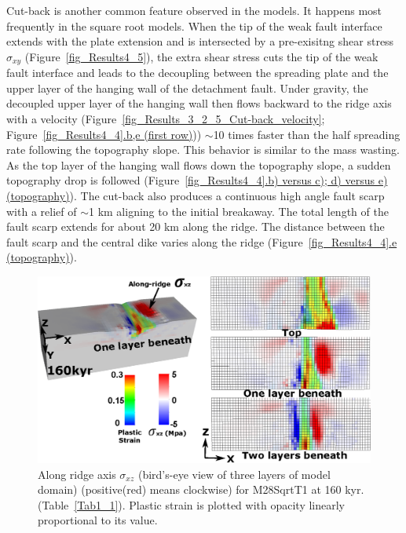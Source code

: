 Cut-back is another common feature observed in the models. It happens most frequently in the square root models. When the tip of the weak fault interface extends with the plate extension and is intersected by a pre-exisitng shear stress $\sigma_{xy}$ (Figure~\hyperref[fig_Results4_5]{\ref{fig_Results4_5}}), the extra shear stress cuts the tip of the weak fault interface and leads to the decoupling between the spreading plate and the upper layer of the hanging wall of the detachment fault. Under gravity, the decoupled upper layer of the hanging wall then flows backward to the ridge axis with a velocity (Figure~\hyperref[fig_Results_3_2_5_Cut-back_velocity]{\ref{fig_Results_3_2_5_Cut-back_velocity}}; Figure~\hyperref[fig_Results4_4]{\ref{fig_Results4_4}.b,e (first row)})) $\sim$10 times faster than the half spreading rate following the topography slope. This behavior is similar to the mass wasting. As the top layer of the hanging wall flows down the topography slope, a sudden topography drop is followed (Figure~\hyperref[fig_Results4_4]{\ref{fig_Results4_4}.b) versus c); d) versus e) (topography)}). The cut-back also produces a continuous high angle fault scarp with a relief of $\sim$1 km aligning to the initial breakaway. The total length of the fault scarp extends for about 20 km along the ridge. The distance between the fault scarp and the central dike varies along the ridge (Figure~\hyperref[fig_Results4_4]{\ref{fig_Results4_4}.e (topography)}).  

\begin{figure}[h]
  \centering
    \includegraphics[width=1.0\textwidth]{./Figures/fig_Results_3_2_5_sqrt_cut_back_Sxz_beneath.eps}
  \caption{Along ridge axis $\sigma_{xz}$ (bird's-eye view of three layers of model domain) (positive(red) means clockwise) for M28SqrtT1 at 160 kyr. (Table~\hyperref[Tab1_1]{\ref{Tab1_1}}). Plastic strain is plotted with opacity linearly proportional to its value.}
 \label{fig_Results_3_2_5_sqrt_cut_back_Sxz_beneath}
\end{figure}

